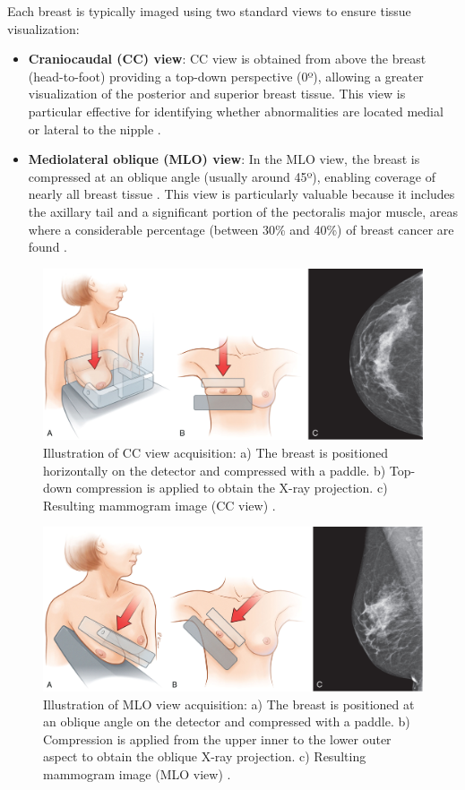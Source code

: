 \documentclass[a4paper,10pt]{book}
\begin{document}
Each breast is typically imaged using two standard views to ensure tissue visualization:

\begin{itemize}
    \item \textbf{Craniocaudal (CC) view}: CC view is obtained from above the breast (head-to-foot) providing a top-down perspective (0º), allowing a greater visualization of the posterior and superior breast tissue. This view is particular effective for identifying whether abnormalities are located medial or lateral to the nipple \cite{noauthor_guide_nodate}.
    \item \textbf{Mediolateral oblique (MLO) view}: In the MLO view, the breast is compressed at an oblique angle (usually around 45º), enabling coverage of nearly all breast tissue \cite{noauthor_guide_nodate}. This view is particularly valuable because it includes the axillary tail and a significant portion of the pectoralis major muscle, areas where a considerable percentage (between 30\% and 40\%) of breast cancer are found \cite{aljarrah_trends_2014, noauthor_breast_2015}.
\end{itemize}



\begin{figure}[h!]
    \centering
    \includegraphics[width=0.5\linewidth]{reports//assets/cc_view.jpg}
    \caption{Illustration of CC view acquisition: a) The breast is positioned horizontally on the detector and compressed with a paddle. b) Top-down compression is applied to obtain the X-ray projection. 
    c) Resulting mammogram image (CC view) \cite{imaging_introduction_2022}. }
    \label{fig:cc_view}
\end{figure}

\begin{figure}[h!]
    \centering
    \includegraphics[width=0.5\linewidth]{reports//assets/mlo_view.jpg}
    \caption{Illustration of MLO view acquisition: a) The breast is positioned at an oblique angle on the detector and compressed with a paddle. b) Compression is applied from the upper inner to the lower outer aspect to obtain the oblique X-ray projection. c) Resulting mammogram image (MLO view) \cite{imaging_introduction_2022}.}
    \label{fig:mlo_view}
\end{figure}
\end{document}
